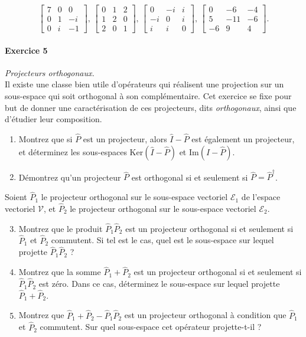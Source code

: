 \[
\left[
\begin{array}{ccc}
7 & 0 & 0 \\ 
0 & 1 & -i \\ 
0 & i & -1
\end{array} 
\right], \,
\left[
\begin{array}{ccc}
0 & 1 & 2 \\ 
1 &2 & 0 \\ 
2 & 0 & 1
\end{array} 
\right], \,
\left[
\begin{array}{ccc}
0 & -i & i \\ 
-i & 0 & i \\ 
i & i & 0
\end{array} 
\right], \,
\left[
\begin{array}{ccc}
0 & -6 & -4 \\ 
5 & -11 & -6 \\ 
-6 & 9 & 4
\end{array} 
\right].
\]
$ $


	
\paragraph{Exercice 5} \textit{Projecteurs orthogonaux.}\\ 
Il existe une classe bien utile d'opérateurs qui réalisent une projection sur un sous-espace qui soit orthogonal à son complémentaire. Cet exercice se fixe pour but de donner une caractérisation de ces projecteurs, dits \textit{orthogonaux}, ainsi que d'étudier leur composition.
\begin{enumerate}
\item Montrez que si $\hat P$ est un projecteur, alors $ \hat I - \hat P$ est également un projecteur, et déterminez les sous-espaces $\text{Ker}(\hat I - \hat P)$ et $\text{Im}(\hat I - \hat P)$.
\item Démontrez qu'un projecteur $\hat P$ est orthogonal si et seulement si $\hat P = \hat P^\dagger$.
\end{enumerate}
Soient $\hat P_1$ le projecteur orthogonal sur le sous-espace vectoriel $\mathcal{E} _1$ de l'espace vectoriel $\mathcal{V}$, et $\hat P_2$ le projecteur orthogonal sur le sous-espace vectoriel $\mathcal{E}_2$.
\begin{enumerate}
\setcounter{enumi}{2}
\item Montrez que le produit $\hat P_1\hat P_2$ est un projecteur orthogonal si et seulement si $\hat P_1$ et $\hat P_2$ commutent. Si tel est le cas, quel est le sous-espace sur lequel projette $\hat P_1\hat P_2$ ?
\item  Montrez que la somme $\hat P_1+\hat P_2$ est un projecteur orthogonal si et seulement si $\hat P_1\hat P_2$ est zéro. Dans ce cas, déterminez le sous-espace sur lequel projette $\hat P_1+\hat P_2$.
\item Montrez que $\hat P_1 +\hat P_2 - \hat P_1\hat P_2$ est un projecteur orthogonal à condition que $\hat P_1$ et $\hat P_2$ commutent. Sur quel sous-espace cet opérateur projette-t-il ?
\end{enumerate}


